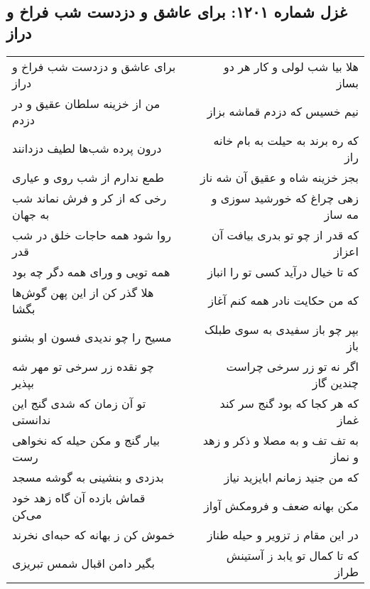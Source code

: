 \begin{center}
\section*{غزل شماره ۱۲۰۱: برای عاشق و دزدست شب فراخ و دراز}
\label{sec:1201}
\begin{longtable}{l p{0.5cm} r}
برای عاشق و دزدست شب فراخ و دراز
&&
هلا بیا شب لولی و کار هر دو بساز
\\
من از خزینه سلطان عقیق و در دزدم
&&
نیم خسیس که دزدم قماشه بزاز
\\
درون پرده شب‌ها لطیف دزدانند
&&
که ره برند به حیلت به بام خانه راز
\\
طمع ندارم از شب روی و عیاری
&&
بجز خزینه شاه و عقیق آن شه ناز
\\
رخی که از کر و فرش نماند شب به جهان
&&
زهی چراغ که خورشید سوزی و مه ساز
\\
روا شود همه حاجات خلق در شب قدر
&&
که قدر از چو تو بدری بیافت آن اعزاز
\\
همه تویی و ورای همه دگر چه بود
&&
که تا خیال درآید کسی تو را انباز
\\
هلا گذر کن از این پهن گوش‌ها بگشا
&&
که من حکایت نادر همه کنم آغاز
\\
مسیح را چو ندیدی فسون او بشنو
&&
بپر چو باز سفیدی به سوی طبلک باز
\\
چو نقده زر سرخی تو مهر شه بپذیر
&&
اگر نه تو زر سرخی چراست چندین گاز
\\
تو آن زمان که شدی گنج این ندانستی
&&
که هر کجا که بود گنج سر کند غماز
\\
بیار گنج و مکن حیله که نخواهی رست
&&
به تف تف و به مصلا و ذکر و زهد و نماز
\\
بدزدی و بنشینی به گوشه مسجد
&&
که من جنید زمانم ابایزید نیاز
\\
قماش بازده آن گاه زهد خود می‌کن
&&
مکن بهانه ضعف و فرومکش آواز
\\
خموش کن ز بهانه که حبه‌ای نخرند
&&
در این مقام ز تزویر و حیله طناز
\\
بگیر دامن اقبال شمس تبریزی
&&
که تا کمال تو یابد ز آستینش طراز
\\
\end{longtable}
\end{center}
